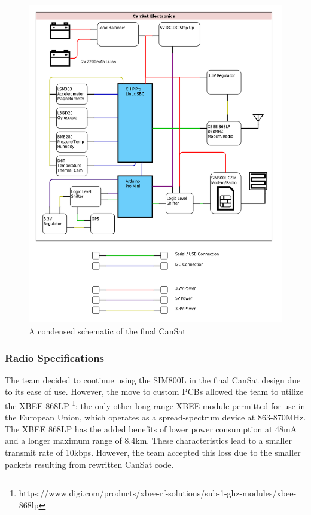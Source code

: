 \documentclass[]{report}
\begin{document}
		\begin{figure}[h]
			\hfill\includegraphics[scale=0.7]{CanSat-detail.png}\hspace*{\fill}
			\caption{A condensed schematic of the final CanSat}
			\label{cschem}
		\end{figure}
		
		\subsubsection{Radio Specifications}
			
		The team decided to continue using the SIM800L in the final CanSat design due to its ease of use. However, the move to custom PCBs allowed the team to utilize the XBEE 868LP \footnote{https://www.digi.com/products/xbee-rf-solutions/sub-1-ghz-modules/xbee-868lp}: the only other long range XBEE module permitted for use in the European Union, which operates as a spread-spectrum device at 863-870MHz. The XBEE 868LP has the added benefits of lower power consumption at 48mA and a longer maximum range of 8.4km. These characteristics lead to a smaller transmit rate of 10kbps. However, the team accepted this loss due to the smaller packets resulting from rewritten CanSat code.
		
\end{document}
